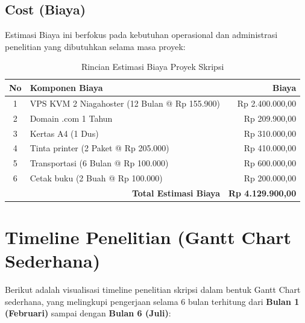\documentclass[12pt, a4paper]{article}
\begin{document}
\subsection{Cost (Biaya)}
Estimasi Biaya ini berfokus pada kebutuhan operasional dan administrasi penelitian yang dibutuhkan selama masa proyek:
\begin{table}[htbp]
    \centering
    \caption{Rincian Estimasi Biaya Proyek Skripsi}
    \label{tab:biaya_mk}
    \fontsize{10pt}{13pt}\selectfont
    \begin{tabularx}{\textwidth}{|c|X|r|}
        \hline
        \textbf{No} & \textbf{Komponen Biaya} & \textbf{Biaya} \\
        \hline
        1 & VPS KVM 2 Niagahoster (12 Bulan @ Rp 155.900) & Rp 2.400.000,00 \\
        \hline
        2 & Domain .com 1 Tahun & Rp 209.900,00 \\
        \hline
        3 & Kertas A4 (1 Dus) & Rp 310.000,00 \\
        \hline
        4 & Tinta printer (2 Paket @ Rp 205.000) & Rp 410.000,00 \\
        \hline
        5 & Transportasi (6 Bulan @ Rp 100.000) & Rp 600.000,00 \\
        \hline
        6 & Cetak buku (2 Buah @ Rp 100.000) & Rp 200.000,00 \\
        \hline
        \multicolumn{2}{|r|}{\textbf{Total Estimasi Biaya}} & \textbf{Rp 4.129.900,00} \\
        \hline
    \end{tabularx}
\end{table}



\section{Timeline Penelitian (Gantt Chart Sederhana)}

Berikut adalah visualisasi timeline penelitian skripsi dalam bentuk Gantt Chart sederhana, yang melingkupi pengerjaan selama 6 bulan terhitung dari \textbf{Bulan 1 (Februari)} sampai dengan \textbf{Bulan 6 (Juli)}:
\end{document}

